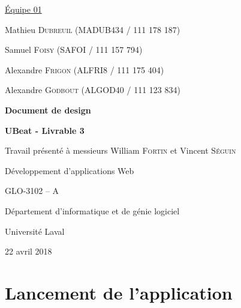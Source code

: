 \documentclass[12pt, letterpaper]{article}
\begin{document}
    \begin{titlepage}
        {\setlength{\parindent}{0pt}
            \underline{Équipe 01} \par
            Mathieu \textsc{Dubreuil} (MADUB434 / 111 178 187) \par
            Samuel \textsc{Foisy} (SAFOI / 111 157 794) \par
            Alexandre \textsc{Frigon} (ALFRI8 / 111 175 404) \par
            Alexandre \textsc{Godbout} (ALGOD40 / 111 123 834) \par
        }

        \begin{center}
            \vspace{4cm}
            {\Large\textbf{Document de design} \par}
            {\large\textbf{UBeat - Livrable 3} \par}

            \vspace{2cm}
            {\large Travail présenté à messieurs William \textsc{Fortin} et Vincent \textsc{Séguin} \par}

            \vspace{1.25cm}
            {\large
                Développement d'applications Web \par
                GLO-3102 -- A \par
            }

            \vfill
            Département d’informatique et de génie logiciel \par
            Université Laval \par
            22 avril 2018 \par
        \end{center}
    \end{titlepage}

    \section*{Lancement de l'application}
\end{document}
